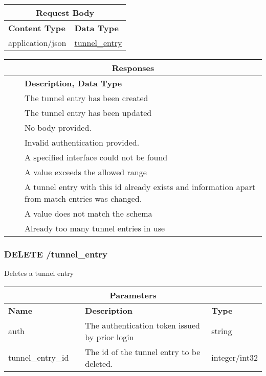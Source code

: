 \begin{longtable}{ |p{3cm}|p{7.88cm}| }
\hline
\multicolumn{2}{|c|}{\textbf{Request Body}} \\
 \hline
\textbf{Content Type} & \textbf{Data Type} \\
\hline
application/json & \hyperref[vpn_gateway_tunnel_entry]{tunnel\_entry} \\
 \hline
\end{longtable}

\begin{longtable}{ |p{1.0cm}|p{3cm}|p{6.44cm}| }
\hline
\multicolumn{3}{|c|}{\textbf{Responses}} \\
 \hline
\centering{\textbf{Code}} & \centering{\textbf{Content Type}} & \textbf{Description, Data Type} \\
\hline
\centering{201} & \centering{text/plain} & The tunnel entry has been created \\
 \hline
\endhead
\centering{202} & \centering{text/plain} & The tunnel entry has been updated \\
 \hline
\centering{400} & \centering{text/plain} & No body provided. \\
 \hline
\centering{403} & \centering{text/plain} & Invalid authentication provided. \\
 \hline
\centering{404} & \centering{text/plain} & A specified interface could not be found \\
 \hline
\centering{406} & \centering{text/plain} & A value exceeds the allowed range \\
 \hline
\centering{409} & \centering{text/plain} & A tunnel entry with this id already exists and information apart from match entries was changed. \\
 \hline
\centering{412} & \centering{text/plain} & A value does not match the schema \\
 \hline
\centering{507} & \centering{text/plain} & Already too many tunnel entries in use \\
 \hline
\end{longtable}

\newpage
\subsubsection{DELETE /tunnel\_entry}
Deletes a tunnel entry
\begin{longtable}{ |p{2.5cm}|p{1.5cm}|p{4cm}|p{2cm}| }
\hline
\multicolumn{4}{|c|}{\textbf{Parameters}} \\
 \hline
\textbf{Name} & \centering{\textbf{Location}} & \textbf{Description} & \textbf{Type} \\
\hline
auth & \centering{QUERY} & The authentication token issued by prior login & string \\
 \hline
tunnel\_entry\_id & \centering{QUERY} & The id of the tunnel entry to be deleted. & integer/int32 \\
 \hline
\endhead \end{longtable}

